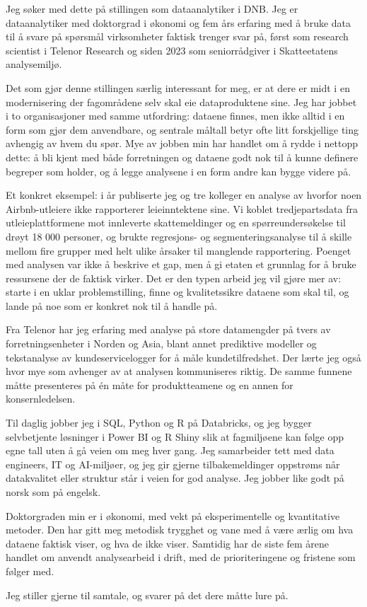 \documentclass[10pt,a4paper,roman]{moderncv}
\date{30. juli 2026}
\begin{document}
\makelettertitle

Jeg søker med dette på stillingen som dataanalytiker i DNB. Jeg er dataanalytiker
med doktorgrad i økonomi og fem års erfaring med å bruke data til å svare på
spørsmål virksomheter faktisk trenger svar på, først som research scientist i
Telenor Research og siden 2023 som seniorrådgiver i Skatteetatens analysemiljø.

Det som gjør denne stillingen særlig interessant for meg, er at dere er midt i en
modernisering der fagområdene selv skal eie dataproduktene sine. Jeg har jobbet i
to organisasjoner med samme utfordring: dataene finnes, men ikke alltid i en form
som gjør dem anvendbare, og sentrale måltall betyr ofte litt forskjellige ting
avhengig av hvem du spør. Mye av jobben min har handlet om å rydde i nettopp
dette: å bli kjent med både forretningen og dataene godt nok til å kunne
definere begreper som holder, og å legge analysene i en form andre kan bygge
videre på.

Et konkret eksempel: i år publiserte jeg og tre kolleger en analyse av hvorfor
noen Airbnb-utleiere ikke rapporterer leieinntektene sine. Vi koblet
tredjepartsdata fra utleieplattformene mot innleverte skattemeldinger og en
spørreundersøkelse til drøyt 18 000 personer, og brukte regresjons- og
segmenteringsanalyse til å skille mellom fire grupper med helt ulike årsaker til
manglende rapportering. Poenget med analysen var ikke å beskrive et gap, men å gi
etaten et grunnlag for å bruke ressursene der de faktisk virker. Det er den typen
arbeid jeg vil gjøre mer av: starte i en uklar problemstilling, finne og
kvalitetssikre dataene som skal til, og lande på noe som er konkret nok til å
handle på.

Fra Telenor har jeg erfaring med analyse på store datamengder på tvers av
forretningsenheter i Norden og Asia, blant annet prediktive modeller og
tekstanalyse av kundeservicelogger for å måle kundetilfredshet. Der lærte jeg
også hvor mye som avhenger av at analysen kommuniseres riktig. De samme funnene
måtte presenteres på én måte for produktteamene og en annen for konsernledelsen.

Til daglig jobber jeg i SQL, Python og R på Databricks, og jeg bygger
selvbetjente løsninger i Power BI og R Shiny slik at fagmiljøene kan følge opp
egne tall uten å gå veien om meg hver gang. Jeg samarbeider tett med data
engineers, IT og AI-miljøer, og jeg gir gjerne tilbakemeldinger oppstrøms når
datakvalitet eller struktur står i veien for god analyse. Jeg jobber like godt på
norsk som på engelsk.

Doktorgraden min er i økonomi, med vekt på eksperimentelle og kvantitative
metoder. Den har gitt meg metodisk trygghet og vane med å være ærlig om hva
dataene faktisk viser, og hva de ikke viser. Samtidig har de siste fem årene
handlet om anvendt analysearbeid i drift, med de prioriteringene og fristene som
følger med.

Jeg stiller gjerne til samtale, og svarer på det dere måtte lure på.

\makeletterclosing
\end{document}
